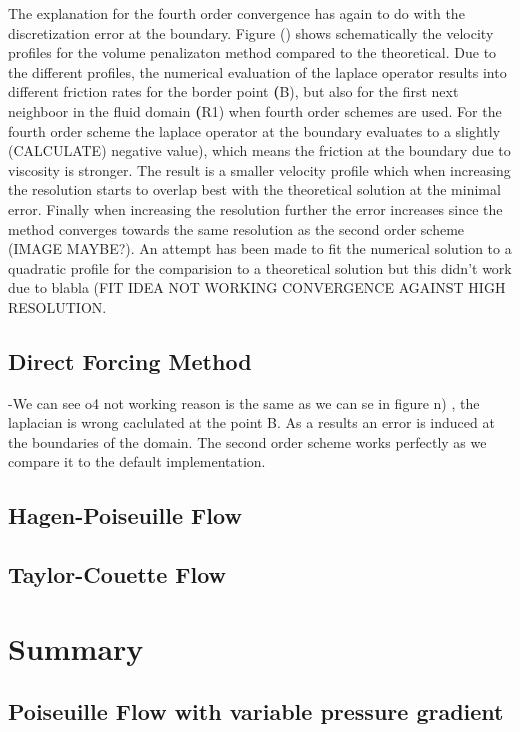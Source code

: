 The explanation for the fourth order convergence has again to do with the discretization error at the boundary.
Figure () shows schematically the velocity profiles for the volume penalizaton method compared to the theoretical.
Due to the different  profiles, the numerical evaluation of the laplace operator results
into different friction rates for the border point \textbf(B), but  also for the first next neighboor in the fluid domain \textbf(R1) when fourth order schemes are used.
For the fourth order scheme the laplace operator at the boundary evaluates to a slightly (CALCULATE) negative value), which means the friction at the boundary due to
viscosity is stronger. The result is a smaller velocity profile which when increasing the resolution starts to overlap best with the theoretical solution at the minimal error.
Finally when increasing the resolution further the error increases since the method converges towards the same resolution as the second order scheme (IMAGE MAYBE?).
An attempt has been made to fit the numerical solution to a quadratic profile for the comparision to a theoretical solution but this didn't work due to blabla
(FIT IDEA NOT WORKING CONVERGENCE AGAINST HIGH RESOLUTION.

\subsection{Direct Forcing Method}
-We can see o4 not working reason is the same as we can se in figure n) , the laplacian is wrong caclulated at the point B.
As a results an error is induced at the boundaries of the domain.
The second order scheme works perfectly as we compare it to the default implementation.


\subsection{Hagen-Poiseuille Flow}
\subsection{Taylor-Couette Flow}
\section{Summary}

\clearpage
\clearpage
\clearpage

\subsection{Poiseuille Flow with variable pressure gradient}

